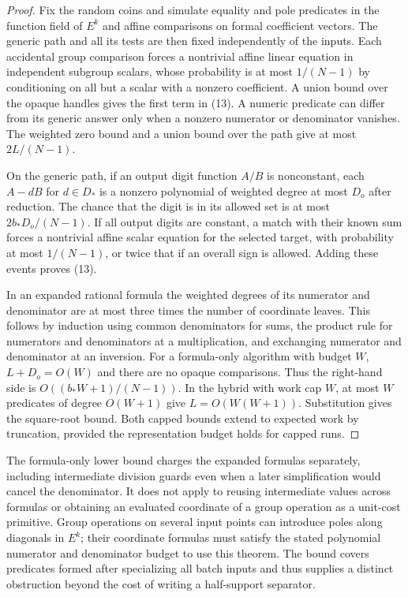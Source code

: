 \documentclass[11pt]{article}
\begin{document}
\begin{proof}
Fix the random coins and simulate equality and pole predicates in the function field of \(E^k\) and affine comparisons on formal coefficient vectors. The generic path and all its tests are then fixed independently of the inputs. Each accidental group comparison forces a nontrivial affine linear equation in independent subgroup scalars, whose probability is at most \(1/(N-1)\) by conditioning on all but a scalar with a nonzero coefficient. A union bound over the opaque handles gives the first term in (13). A numeric predicate can differ from its generic answer only when a nonzero numerator or denominator vanishes. The weighted zero bound and a union bound over the path give at most \(2L/(N-1)\).

On the generic path, if an output digit function \(A/B\) is nonconstant, each \(A-dB\) for \(d\in D_*\) is a nonzero polynomial of weighted degree at most \(D_o\) after reduction. The chance that the digit is in its allowed set is at most \(2b_*D_o/(N-1)\). If all output digits are constant, a match with their known sum forces a nontrivial affine scalar equation for the selected target, with probability at most \(1/(N-1)\), or twice that if an overall sign is allowed. Adding these events proves (13).

In an expanded rational formula the weighted degrees of its numerator and denominator are at most three times the number of coordinate leaves. This follows by induction using common denominators for sums, the product rule for numerators and denominators at a multiplication, and exchanging numerator and denominator at an inversion. For a formula-only algorithm with budget \(W\), \(L+D_o=O(W)\) and there are no opaque comparisons. Thus the right-hand side is \(O((b_*W+1)/(N-1))\). In the hybrid with work cap \(W\), at most \(W\) predicates of degree \(O(W+1)\) give \(L=O(W(W+1))\). Substitution gives the square-root bound. Both capped bounds extend to expected work by truncation, provided the representation budget holds for capped runs.
\end{proof}

The formula-only lower bound charges the expanded formulas separately, including intermediate division guards even when a later simplification would cancel the denominator. It does not apply to reusing intermediate values across formulas or obtaining an evaluated coordinate of a group operation as a unit-cost primitive. Group operations on several input points can introduce poles along diagonals in \(E^k\); their coordinate formulas must satisfy the stated polynomial numerator and denominator budget to use this theorem. The bound covers predicates formed after specializing all batch inputs and thus supplies a distinct obstruction beyond the cost of writing a half-support separator.
\end{document}
